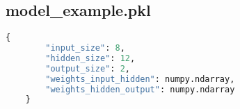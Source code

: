 \documentclass[a4paper,12pt]{article}
\begin{document}
\subsection*{model\_example.pkl}
\begin{lstlisting}[language=Python, caption={model\_example.pkl}]
	{
		"input_size": 8,                      
		"hidden_size": 12,                   
		"output_size": 2,                     
		"weights_input_hidden": numpy.ndarray,
		"weights_hidden_output": numpy.ndarray 
	}
\end{lstlisting}
\end{document}

